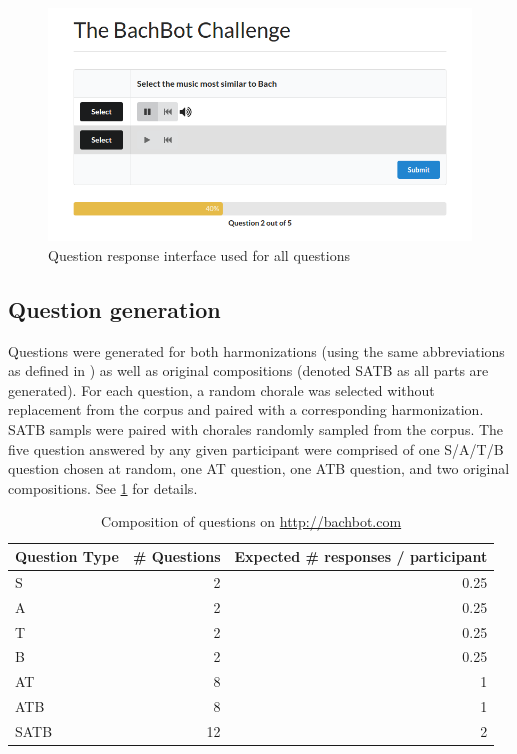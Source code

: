 \begin{figure}[htpb]
  \centering
  \includegraphics[width=1.0\linewidth]{question-screen.png}
  \caption{Question response interface used for all questions}
  \label{fig:question-screen}
\end{figure}

\subsection{Question generation}

Questions were generated for both harmonizations (using the same abbreviations
as defined in ) as well as original compositions (denoted SATB as all parts
are generated). For each question, a random chorale was selected without
replacement from the corpus and paired with a corresponding harmonization.
SATB sampls were paired with chorales randomly sampled from the corpus. The
five question answered by any given participant were comprised of one S/A/T/B
question chosen at random, one AT question, one ATB question, and two original
compositions. See
\cref{tab:bachbot-com-question-distribtion} for details.

\begin{table}[htpb]
  \centering
  \begin{tabular}{lrr}
    \toprule
    Question Type & \# Questions &  Expected \# responses / participant \\
    \midrule
    S        & 2  & 0.25 \\
    A        & 2  & 0.25 \\
    T        & 2  & 0.25 \\
    B        & 2  & 0.25 \\
    AT       & 8  & 1 \\
    ATB      & 8  & 1 \\
    SATB     & 12 & 2 \\
    \bottomrule
  \end{tabular}
  \caption{Composition of questions on \url{http://bachbot.com}}
  \label{tab:bachbot-com-question-distribtion}
\end{table}

